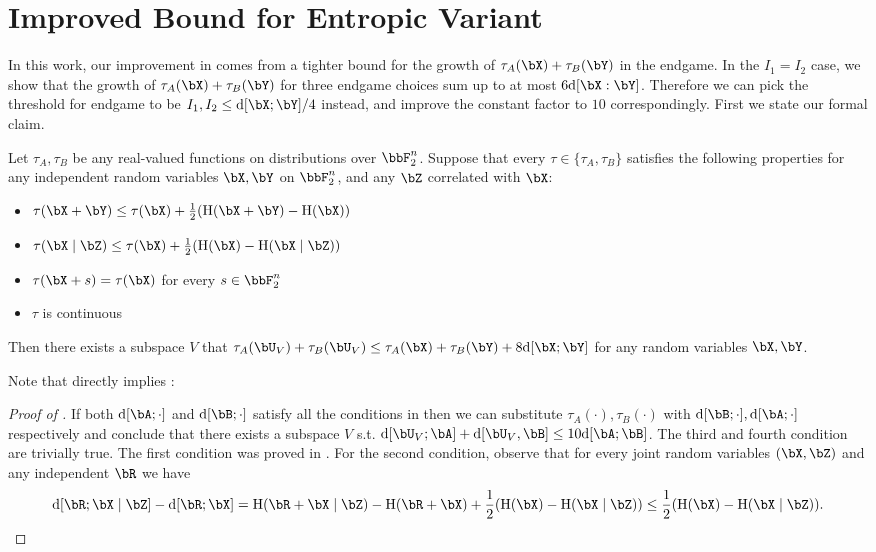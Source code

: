 \documentclass{article}
\DeclarePairedDelimiter{\paren}{(}{)}
\DeclarePairedDelimiter{\sqpar}{[}{]}
\newcommand{\ent}{\mathrm{H}\paren}
\newcommand{\Ruz}{\mathrm{d}\sqpar}
\begin{document}
\section{Improved Bound for Entropic Variant}
In this work, our improvement in  comes from a tighter bound for the growth of $\tau_A(\bX)+\tau_B(\bY)$ in the endgame. In the $I_1=I_2$ case, we show that the growth of $\tau_A(\bX)+\tau_B(\bY)$ for three endgame choices sum up to at most $6\Ruz{\bX:\bY}$. Therefore we can pick the threshold for endgame to be $I_1,I_2\le \Ruz{\bX;\bY}/4$ instead, and improve the constant factor to $10$ correspondingly. First we state our formal claim.
\begin{lemma}\label{lemma:main}
Let $\tau_A,\tau_B$ be any real-valued functions on distributions over $\bbF_2^n$. Suppose that every $\tau\in\{\tau_A,\tau_B\}$ satisfies the following properties for any independent random variables $\bX,\bY$ on $\bbF_2^n$, and any $\bZ$ correlated with $\bX$:
\begin{itemize}
\item 
$\tau\paren{\bX+\bY}\le \tau\paren{\bX}+\frac{1}{2}\paren{\ent{\bX+\bY}-\ent{\bX}}$
\item 
$\tau\paren{\bX\mid\bZ}\le  \tau\paren{\bX}+\frac{1}{2}\paren{\ent{\bX}-\ent{\bX\mid\bZ}}$
\item
$\tau(\bX+s)=\tau(\bX)$ for every $s\in\bbF_2^n$
\item
$\tau$ is continuous
\end{itemize}
Then there exists a subspace $V$ that $\tau_A(\bU_V)+\tau_B(\bU_V)\le \tau_A(\bX)+\tau_B(\bY)+8\Ruz{\bX;\bY}$ for any random variables $\bX,\bY$.
\end{lemma}
\noindent 
Note that  directly implies :
\begin{proof}[Proof of ]
If both $\Ruz{\bA;\cdot}$ and $\Ruz{\bB;\cdot}$ satisfy all the conditions in  then we can substitute $\tau_A(\cdot),\tau_B(\cdot)$ with $\Ruz{\bB;\cdot},\Ruz{\bA;\cdot}$ respectively and conclude that there exists a subspace $V$ s.t. $\Ruz{\bU_V;\bA}+\Ruz{\bU_V,\bB}\le 10\Ruz{\bA;\bB}$. The third and fourth condition are trivially true. The first condition was proved in \cite[Lemma 5.2]{GGMT23}. For the second condition, observe that for every joint random variables $(\bX,\bZ)$ and any independent $\bR$ we have 
$$\Ruz{\bR;\bX\mid\bZ}-\Ruz{\bR;\bX}=\ent{\bR+\bX\mid\bZ}-\ent{\bR+\bX}+\frac{1}{2}(\ent{\bX}-\ent{\bX\mid\bZ})\le \frac{1}{2}(\ent{\bX}-\ent{\bX\mid\bZ}).$$

\end{proof}
\end{document}

